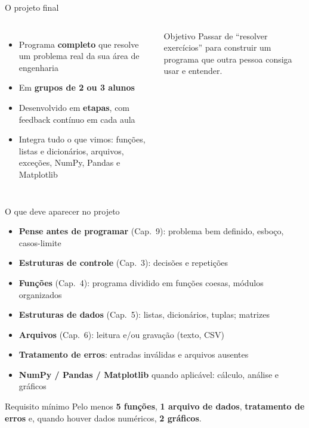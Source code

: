 \documentclass[aspectratio=169,10pt,t]{beamer}
\begin{document}
\capa

\begin{frame}{O projeto final}
  \begin{columns}[T]
    \begin{itemize}
      \item Programa \textbf{completo} que resolve um problema real da sua área de engenharia
      \item Em \textbf{grupos de 2 ou 3 alunos}
      \item Desenvolvido em \textbf{etapas}, com feedback contínuo em cada aula
      \item Integra tudo o que vimos: funções, listas e dicionários, arquivos, exceções, NumPy, Pandas e Matplotlib
    \end{itemize}
    \begin{exampleblock}{Objetivo}
      Passar de ``resolver exercícios'' para \alert{construir um programa} que outra pessoa consiga usar e entender.
    \end{exampleblock}
  \end{columns}
\end{frame}

\begin{frame}{O que deve aparecer no projeto}
  \begin{itemize}
    \item \textbf{Pense antes de programar} (Cap.~9): problema bem definido, esboço, casos-limite
    \item \textbf{Estruturas de controle} (Cap.~3): decisões e repetições
    \item \textbf{Funções} (Cap.~4): programa dividido em funções coesas, módulos organizados
    \item \textbf{Estruturas de dados} (Cap.~5): listas, dicionários, tuplas; matrizes
    \item \textbf{Arquivos} (Cap.~6): leitura e/ou gravação (texto, CSV)
    \item \textbf{Tratamento de erros}: entradas inválidas e arquivos ausentes
    \item \textbf{NumPy / Pandas / Matplotlib} quando aplicável: cálculo, análise e gráficos
  \end{itemize}
  \begin{alertblock}{Requisito mínimo}
    Pelo menos \textbf{5 funções}, \textbf{1 arquivo de dados}, \textbf{tratamento de erros} e, quando houver dados numéricos, \textbf{2 gráficos}.
  \end{alertblock}
\end{frame}
\end{document}
